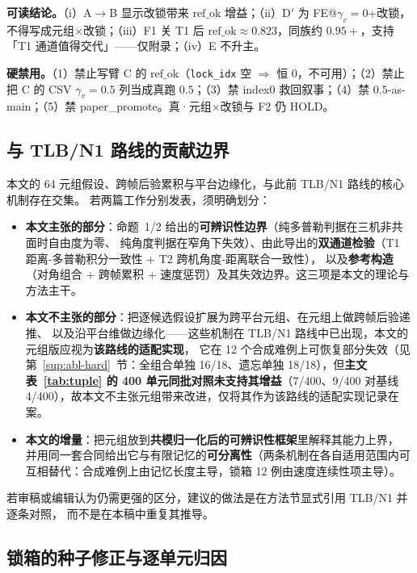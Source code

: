 \documentclass[UTF8,a4paper,zihao=-4]{ctexart}
\begin{document}
\noindent\textbf{可读结论。}（i）A$\to$B 显示改锁带来 $\mathrm{ref\_ok}$ 增益；（ii）D$'$ 为 FE@$\gamma_v=0$+改锁，不得写成元组$\times$改锁；（iii）F1 关 T1 后 $\mathrm{ref\_ok}\approx0.823$，同族约 $0.95+$，支持「T1 通道值得交代」——仅附录；（iv）E 不升主。

\noindent\textbf{硬禁用。}（1）禁止写臂 C 的 $\mathrm{ref\_ok}$（\texttt{lock\_idx} 空 $\Rightarrow$ 恒 0，不可用）；（2）禁止把 C 的 CSV $\gamma_v=0.5$ 列当成真跑 $0.5$；（3）禁 index0 救回叙事；（4）禁 $0.5$-as-main；（5）禁 paper\_promote。真·元组$\times$改锁与 F2 仍 HOLD。

\subsection{与 TLB/N1 路线的贡献边界}\label{sup:tlb-boundary}

本文的 64 元组假设、跨帧后验累积与平台边缘化，与此前 TLB/N1 路线的核心机制存在交集。
若两篇工作分别发表，须明确划分：

\begin{itemize}
\item \textbf{本文主张的部分}：命题~1/2 给出的\textbf{可辨识性边界}（纯多普勒判据在三机非共面时自由度为零、
纯角度判据在窄角下失效）、由此导出的\textbf{双通道检验}（T1 距离-多普勒积分一致性 + T2 跨机角度-距离联合一致性），
以及\textbf{参考构造}（对角组合 + 跨帧累积 + 速度惩罚）及其失效边界。这三项是本文的理论与方法主干。
\item \textbf{本文不主张的部分}：把逐候选假设扩展为跨平台元组、在元组上做跨帧后验递推、
以及沿平台维做边缘化——这些机制在 TLB/N1 路线中已出现，本文的元组版应视为\textbf{该路线的适配实现}，
它在 12 个合成难例上可恢复部分失效（见第~\ref{sup:abl-hard}~节：全组合单独 16/18、遗忘单独 18/18），但\textbf{主文表~\ref{tab:tuple} 的 400 单元同批对照未支持其增益}（7/400、9/400 对基线 4/400），故本文不主张元组带来改进，仅将其作为该路线的适配实现记录在案。
\item \textbf{本文的增量}：把元组放到\textbf{共模归一化后的可辨识性框架}里解释其能力上界，
并用同一套合同给出它与有限记忆的\textbf{可分离性}（两条机制在各自适用范围内可互相替代：合成难例上由记忆长度主导，锁箱 12 例由速度连续性项主导）。
\end{itemize}

若审稿或编辑认为仍需更强的区分，建议的做法是在方法节显式引用 TLB/N1 并逐条对照，
而不是在本稿中重复其推导。

\subsection{锁箱的种子修正与逐单元归因}\label{sup:lockbox-attr}
\end{document}
